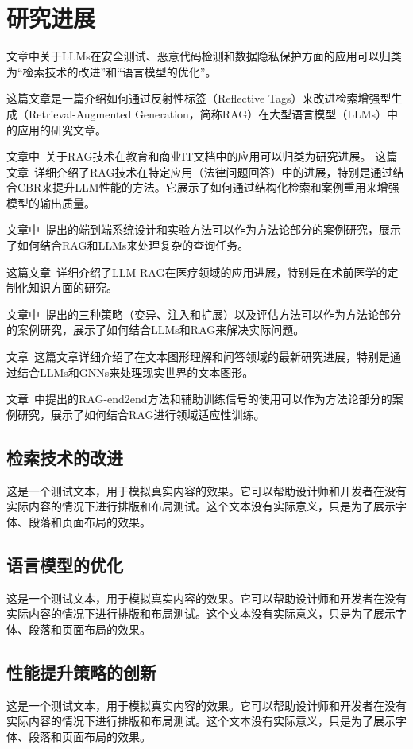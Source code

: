 
\chapter{研究进展}

文章中关于LLMs在安全测试、恶意代码检测和数据隐私保护方面的应用可以归类为“检索技术的改进”和“语言模型的优化”。~\cite{Yao2024}

这篇文章是一篇介绍如何通过反射性标签（Reflective Tags）来改进检索增强型生成（Retrieval-Augmented Generation，简称RAG）在大型语言模型（LLMs）中的应用的研究文章。~\cite{Yang2024}

文章中~\cite{Posedaru2024}关于RAG技术在教育和商业IT文档中的应用可以归类为研究进展。
这篇文章~\cite{Wiratunga2024}详细介绍了RAG技术在特定应用（法律问题回答）中的进展，特别是通过结合CBR来提升LLM性能的方法。它展示了如何通过结构化检索和案例重用来增强模型的输出质量。

文章中~\cite{li2024enhancingllmfactualaccuracy}提出的端到端系统设计和实验方法可以作为方法论部分的案例研究，展示了如何结合RAG和LLMs来处理复杂的查询任务。


这篇文章~\cite{ke2024developmenttestingretrievalaugmented}详细介绍了LLM-RAG在医疗领域的应用进展，特别是在术前医学的定制化知识方面的研究。

文章中~\cite{Daneshvar2024}提出的三种策略（变异、注入和扩展）以及评估方法可以作为方法论部分的案例研究，展示了如何结合LLMs和RAG来解决实际问题。

文章~\cite{He2024}这篇文章详细介绍了在文本图形理解和问答领域的最新研究进展，特别是通过结合LLMs和GNNs来处理现实世界的文本图形。

文章~\cite{siriwardhana2022improvingdomainadaptationretrieval}中提出的RAG-end2end方法和辅助训练信号的使用可以作为方法论部分的案例研究，展示了如何结合RAG进行领域适应性训练。

\section{检索技术的改进}

这是一个测试文本，用于模拟真实内容的效果。它可以帮助设计师和开发者在没有实际内容的情况下进行排版和布局测试。这个文本没有实际意义，只是为了展示字体、段落和页面布局的效果。

\section{语言模型的优化}

这是一个测试文本，用于模拟真实内容的效果。它可以帮助设计师和开发者在没有实际内容的情况下进行排版和布局测试。这个文本没有实际意义，只是为了展示字体、段落和页面布局的效果。

\section{性能提升策略的创新}

这是一个测试文本，用于模拟真实内容的效果。它可以帮助设计师和开发者在没有实际内容的情况下进行排版和布局测试。这个文本没有实际意义，只是为了展示字体、段落和页面布局的效果。
